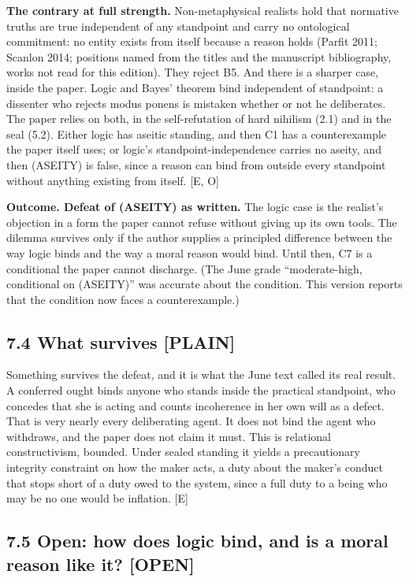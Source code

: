 \documentclass[11pt]{article}
\newcommand{\register}[1]{{\ttfamily\small #1}}
\begin{document}
\textbf{The contrary at full strength.} Non-metaphysical realists hold that normative truths are true independent of any standpoint and carry no ontological commitment: no entity exists from itself because a reason holds (Parfit 2011; Scanlon 2014; positions named from the titles and the manuscript bibliography, works not read for this edition). They reject B5. And there is a sharper case, inside the paper. Logic and Bayes' theorem bind independent of standpoint: a dissenter who rejects modus ponens is mistaken whether or not he deliberates. The paper relies on both, in the self-refutation of hard nihilism (2.1) and in the seal (5.2). Either logic has aseitic standing, and then C1 has a counterexample the paper itself uses; or logic's standpoint-independence carries no aseity, and then (ASEITY) is false, since a reason can bind from outside every standpoint without anything existing from itself. [E, O]

\textbf{Outcome. Defeat of (ASEITY) as written.} The logic case is the realist's objection in a form the paper cannot refuse without giving up its own tools. The dilemma survives only if the author supplies a principled difference between the way logic binds and the way a moral reason would bind. Until then, C7 is a conditional the paper cannot discharge. (The June grade ``moderate-high, conditional on (ASEITY)'' was accurate about the condition. This version reports that the condition now faces a counterexample.)

\subsection*{7.4 What survives \register{[PLAIN]}}

Something survives the defeat, and it is what the June text called its real result. A conferred ought binds anyone who stands inside the practical standpoint, who concedes that she is acting and counts incoherence in her own will as a defect. That is very nearly every deliberating agent. It does not bind the agent who withdraws, and the paper does not claim it must. This is relational constructivism, bounded. Under sealed standing it yields a precautionary integrity constraint on how the maker acts, a duty about the maker's conduct that stops short of a duty owed to the system, since a full duty to a being who may be no one would be inflation. [E]

\subsection*{7.5 Open: how does logic bind, and is a moral reason like it? \register{[OPEN]}}
\end{document}
